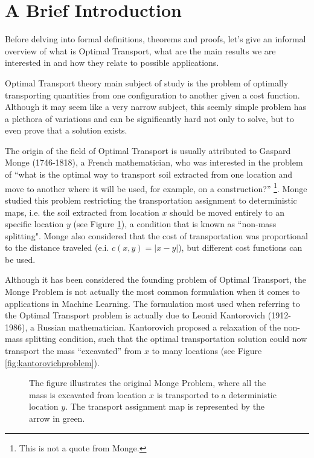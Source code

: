 \section{A Brief Introduction}

Before delving into formal definitions, theorems and proofs, let's give an informal overview of what is
Optimal Transport, what are the main results we are interested in and how they relate to possible applications.

Optimal Transport theory main subject of study is the problem of optimally transporting
quantities from one configuration to another given a cost function. Although it may seem like a very narrow subject,
this seemly simple problem has a plethora of variations and can be significantly hard not only to solve,
but to even prove that a solution exists.

The origin of the field of Optimal Transport is usually
attributed to Gaspard Monge (1746-1818), a French mathematician, who was interested in the problem
of ``what is the optimal way to transport soil extracted from one location and move to another where it will be used,
for example, on a construction?''
\footnote{This is not a quote from Monge.}\citep{villani2008optimal}.
Monge studied this problem restricting the transportation assignment to deterministic maps, i.e. the soil
extracted from location $x$ should be moved entirely to an specific location $y$ (see Figure \ref{fig:mongeproblem}),
a condition that is known as ``non-mass splitting". Monge also considered that the cost of transportation
was proportional to the distance traveled (e.i. $c(x,y) = |x-y|$), but different cost functions can be used.

Although it has been considered the founding problem of Optimal Transport, the Monge Problem is not actually the most
common formulation when it comes to applications in Machine Learning. The formulation most used when referring
to the Optimal Transport problem is actually due to Leonid Kantorovich (1912-1986), a Russian mathematician.
Kantorovich proposed a relaxation of the non-mass splitting condition, such that the optimal transportation
solution could now transport the mass ``excavated'' from $x$ to many locations
(see Figure \ref{fig:kantorovichproblem}).

\begin{figure}[H]
  \centering
  \def\svgscale{0.7}
  
  \caption{The figure illustrates the original Monge Problem, where all the mass is excavated from location
  $x$ is transported to a deterministic location $y$. The transport assignment map is represented by the arrow in green.}
  \label{fig:mongeproblem}
\end{figure}

